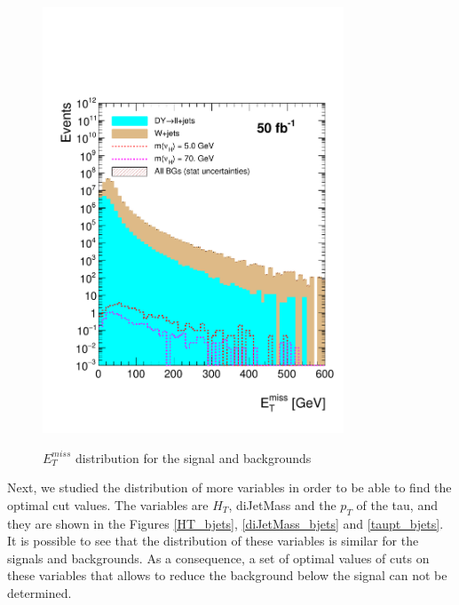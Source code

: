  \begin{figure}[h] 
 \centering
 \caption{$E_T^{miss}$ distribution for the signal and backgrounds}
 \includegraphics[width=0.8\textwidth]{./Capitulos/Analysis/AfterBJets/MET_MET_20} 
 \label{MET_bjets}
 \end{figure}
 
Next, we studied the distribution of more variables in order to be able to find the optimal cut values. The variables are $H_T$, diJetMass and the $p_T$ of the tau, and they are shown in the Figures \ref{HT_bjets}, \ref{diJetMass_bjets} and \ref{taupt_bjets}. It is possible to see that the distribution of these variables is similar for the signals and backgrounds. As a consequence, a set of optimal values of cuts on these variables that allows to reduce the background below the signal can not be determined.
 
